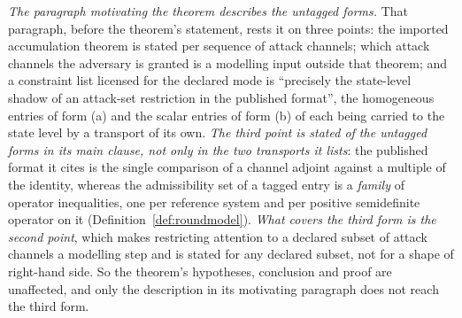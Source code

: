 \begin{remark}
\emph{The paragraph motivating the theorem describes the untagged forms.} That
paragraph, before the theorem's statement, rests it on three points: the
imported accumulation theorem is stated per sequence of attack channels;
which attack channels the adversary is granted is a modelling input outside
that theorem; and a constraint list licensed for the declared mode is
``precisely the state-level shadow of an attack-set restriction in the
published format'', the homogeneous entries of form (a) and the scalar
entries of form (b) of  each being carried
to the state level by a transport of its own. \emph{The third point is stated
of the untagged forms in its main clause, not only in the two transports it
lists}: the published format it cites is the single comparison of a channel
adjoint against a multiple of the identity, whereas the admissibility set of
a tagged entry is a \emph{family} of operator inequalities, one per reference
system and per positive semidefinite operator on it
(Definition~\ref{def:roundmodel}). \emph{What covers the third form is the
second point}, which makes restricting attention to a declared subset of
attack channels a modelling step and is stated for any declared subset, not
for a shape of right-hand side. So the theorem's hypotheses, conclusion and
proof are unaffected, and only the description in its motivating paragraph
does not reach the third form.
\end{remark}
